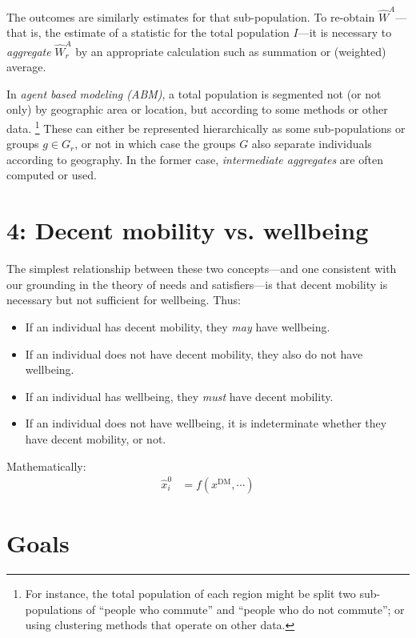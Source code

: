 \documentclass[a5paper,11pt]{article}
\newcommand{\DM}{\text{DM}}
\begin{document}
The outcomes are similarly estimates for that sub-population.
To re-obtain $\hat{W}^A$—that is, the estimate of a statistic for the total population $I$—it is necessary to \emph{aggregate} $\hat{W}^A_r$ by an appropriate calculation such as summation or (weighted) average.

In \emph{agent based modeling (ABM)}, a total population is segmented not (or not only) by geographic area or location, but according to some methods or other data.%
\footnote{For instance, the total population of each region might be split two sub-populations of “people who commute” and “people who do not commute”; or using clustering methods that operate on other data.}
These can either be represented hierarchically as some sub-populations or groups $g \in G_r$, or not in which case the groups $G$ also separate individuals according to geography.
In the former case, \emph{intermediate aggregates} are often computed or used.

\section {4: Decent mobility vs. wellbeing}
The simplest relationship between these two concepts—and one consistent with our grounding in the theory of needs and satisfiers—is that decent mobility is necessary but not sufficient for wellbeing.
Thus:
\begin{itemize}
  \item If an individual has decent mobility, they \emph{may} have wellbeing.
  \item If an individual does not have decent mobility, they also do not have wellbeing.
  \item If an individual has wellbeing, they \emph{must} have decent mobility.
  \item If an individual does not have wellbeing, it is indeterminate whether they have decent mobility, or not.
\end{itemize}

Mathematically:
\begin{align}
  \hat{x}^0_i & = f(x^{\DM}, \cdots) \label{eq:xDM}
\end{align}

\section {Goals}
\end{document}
